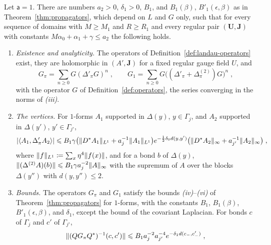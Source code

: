 \documentclass[11pt]{preprint}
\DeclarePairedDelimiter{\abs}{\lvert}{\rvert}
\DeclarePairedDelimiter{\norm}{\lVert}{\rVert}
\numberwithin{equation}{section}
\begin{document}
\begin{theorem}\label{thm:landau-operators}
Let $\mathsf a = 1$. There are numbers $a_2 > 0$, $\delta_1 > 0$, $B_1$, and $B_1(\beta)$, $B'_1(\epsilon, \beta)$ as in Theorem~\ref{thm:propagators}, which depend on $L$ and $G$ only, such that for every sequence of domains with $M \geqslant M_1$ and $R \geqslant R_1$ and every regular pair $(\mathbf U, \mathbf J)$ with constants $M\alpha_0 + \alpha_1 + \gamma \leqslant a_2$ the following holds.
\begin{enumerate}[label=(\roman*)]
\item \emph{Existence and analyticity.} The operators of Definition~\ref{def:landau-operators} exist, they are holomorphic in $(A', \mathbf J)$ for a fixed regular gauge field $U$, and
\begin{equation}\label{eq:landau-series}
    G_\pi = \sum_{n \geqslant 0}G(\Delta'_\pi G)^n\;,
    \qquad
    G_1 = \sum_{n \geqslant 0}G\bigl((\Delta'_\pi + \Delta^{(2)}_\pi)G\bigr)^n\;,
\end{equation}
with the operator $G$ of Definition~\ref{def:operators}, the series converging in the norms of \emph{(iii)}.
\item \emph{The vertices.} For $1$-forms $A_1$ supported in $\Delta(y)$, $y \in \Gamma_j$, and $A_2$ supported in $\Delta(y')$, $y' \in \Gamma_{j'}$,
\begin{equation}\label{eq:vertex-bound}
    \abs{\langle A_1, \Delta'_\pi A_2\rangle} \leqslant B_1\gamma\bigl(\norm{D^*A_1}_{L^1} + a_j^{-1}\norm{A_1}_{L^1}\bigr)e^{-\frac{1}{2}\delta_0d(y, y')}\bigl(\norm{D^*A_2}_\infty + a_{j'}^{-1}\norm{A_2}_\infty\bigr)\;,
\end{equation}
where $\norm f_{L^1} \coloneqq \sum_x\eta^4\norm{f(x)}$, and for a bond $b$ of $\Delta(y)$, $\norm{(\Delta^{(2)}A)(b)} \leqslant B_1\gamma a_j^{-2}\norm A_\infty$ with the supremum of $A$ over the blocks $\Delta(y'')$ with $d(y, y'') \leqslant 2$.
\item \emph{Bounds.} The operators $G_\pi$ and $G_1$ satisfy the bounds \emph{(iv)}--\emph{(vi)} of Theorem~\ref{thm:propagators} for $1$-forms, with the constants $B_1$, $B_1(\beta)$, $B'_1(\epsilon, \beta)$, and $\delta_1$, except the bound of the covariant Laplacian. For bonds $c$ of $\Gamma_j$ and $c'$ of $\Gamma_{j'}$,
\begin{equation}\label{eq:block-form-inverse}
    \norm{(QG_\pi Q^*)^{-1}(c, c')} \leqslant B_1a_j^{-2}a_{j'}^{-4}e^{-\delta_1d(c_-, c'_-)}\;,
\end{equation}

\end{enumerate}
\end{theorem}
\end{document}

